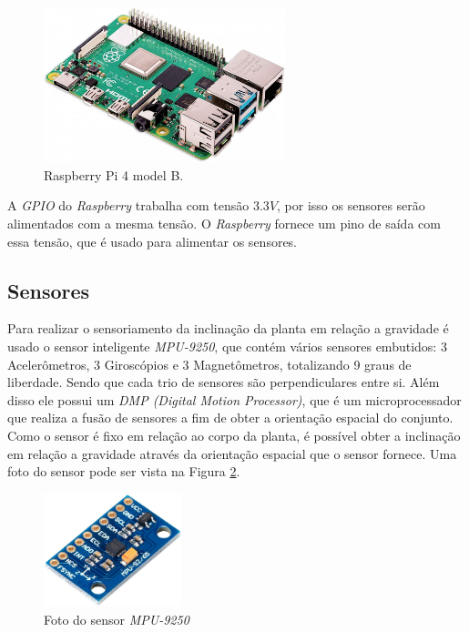         	\begin{figure}[h]
                \centering
                \includegraphics[width=7cm]{Imagens/cap2/rasp2.jpg}
                \caption{Raspberry Pi 4 model B.}
                \label{img:theta}
            \end{figure}
    	
    	    A \textit{GPIO} do \textit{Raspberry} trabalha com tensão $3.3V$, por isso os sensores serão alimentados com a mesma tensão. O \textit{Raspberry} fornece um pino de saída com essa tensão, que é usado para alimentar os sensores.
        
        \subsection{Sensores}
        
        	Para realizar o sensoriamento da inclinação da planta em relação a gravidade é usado o sensor inteligente \textit{MPU-9250}, que contém vários sensores embutidos: 3 Acelerômetros, 3 Giroscópios e 3 Magnetômetros, totalizando 9 graus de liberdade. Sendo que cada trio de sensores são perpendiculares entre si. Além disso ele possui um \textit{DMP (Digital Motion Processor)}, que é um microprocessador que realiza a fusão de sensores a fim de obter a orientação espacial do conjunto. Como o sensor é fixo em relação ao corpo da planta, é possível obter a inclinação em relação a gravidade através da orientação espacial que o sensor fornece. Uma foto do sensor pode ser vista na Figura \ref{img:mpu}.
        	
        	\begin{figure}[h]
                \centering
                \includegraphics[width=4cm]{Imagens/cap2/mpu.png}
                \caption{Foto do sensor \textit{MPU-9250}}
                \label{img:mpu}
            \end{figure}
            
